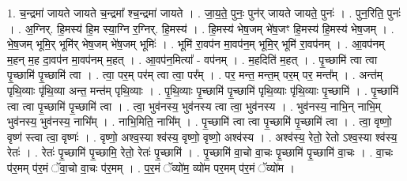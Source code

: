 \documentclass[17pt]{extarticle}
\begin{document}
1. च॒न्द्रमा॑ जायते जायते च॒न्द्रमा᳚ श्च॒न्द्रमा॑ जायते । . जा॒य॒ते॒ पुनः॒ पुन॑र् जायते जायते॒ पुनः॑ । . पुन॒रिति॒ पुनः॑ । . अ॒ग्निर्. हि॒मस्य॑ हि॒म स्या॒ग्नि र॒ग्निर्. हि॒मस्य॑ । . हि॒मस्य॑ भेष॒जम् भे॑ष॒जꣳ हि॒मस्य॑ हि॒मस्य॑ भेष॒जम् । . भे॒ष॒जम् भूमि॒र् भूमि॑र् भेष॒जम् भे॑ष॒जम् भूमिः॑ । . भूमि॑ रा॒वप॑न मा॒वप॑न॒म् भूमि॒र् भूमि॑ रा॒वप॑नम् । . आ॒वप॑नम् म॒हन् म॒ह दा॒वप॑न मा॒वप॑नम् म॒हत् । . आ॒वप॑न॒मित्या᳚ - वप॑नम् । . म॒हदिति॑ म॒हत् । . पृ॒च्छामि॑ त्वा त्वा पृ॒च्छामि॑ पृ॒च्छामि॑ त्वा । . त्वा॒ पर॒म् पर॑म् त्वा त्वा॒ पर᳚म् । . पर॒ मन्त॒ मन्त॒म् पर॒म् पर॒ मन्त᳚म् । . अन्त॑म् पृथि॒व्याः पृ॑थि॒व्या अन्त॒ मन्त॑म् पृथि॒व्याः । . पृ॒थि॒व्याः पृ॒च्छामि॑ पृ॒च्छामि॑ पृथि॒व्याः पृ॑थि॒व्याः पृ॒च्छामि॑ । . पृ॒च्छामि॑ त्वा त्वा पृ॒च्छामि॑ पृ॒च्छामि॑ त्वा । . त्वा॒ भुव॑नस्य॒ भुव॑नस्य त्वा त्वा॒ भुव॑नस्य । . भुव॑नस्य॒ नाभि॒न् नाभि॒म् भुव॑नस्य॒ भुव॑नस्य॒ नाभि᳚म् । . नाभि॒मिति॒ नाभि᳚म् । . पृ॒च्छामि॑ त्वा त्वा पृ॒च्छामि॑ पृ॒च्छामि॑ त्वा । . त्वा॒ वृष्णो॒ वृष्ण॑ स्त्वा त्वा॒ वृष्णः॑ । . वृष्णो॒ अश्व॒स्या श्व॑स्य॒ वृष्णो॒ वृष्णो॒ अश्व॑स्य । . अश्व॑स्य॒ रेतो॒ रेतो ऽश्व॒स्या श्व॑स्य॒ रेतः॑ । . रेतः॑ पृ॒च्छामि॑ पृ॒च्छामि॒ रेतो॒ रेतः॑ पृ॒च्छामि॑ । . पृ॒च्छामि॑ वा॒चो वा॒चः पृ॒च्छामि॑ पृ॒च्छामि॑ वा॒चः । . वा॒चः प॑र॒मम् प॑र॒मं ॅवा॒चो वा॒चः प॑र॒मम् । . प॒र॒मं ॅव्यो॑म॒ व्यो॑म पर॒मम् प॑र॒मं ॅव्यो॑म । \newline
\end{document}
